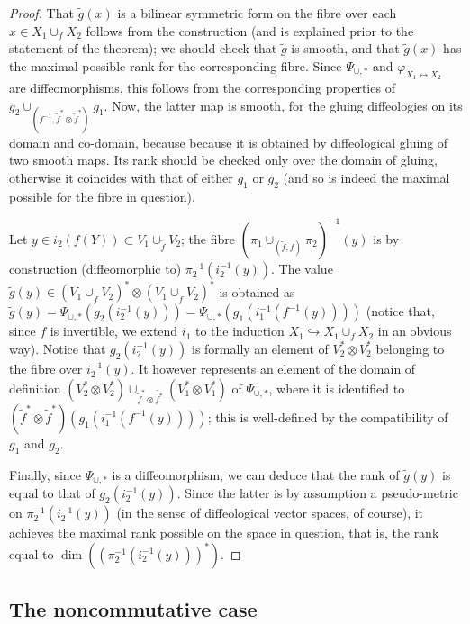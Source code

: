 \documentclass{article}
\begin{document}
\begin{proof}
That $\tilde{g}(x)$ is a bilinear symmetric form on the fibre over each $x\in X_1\cup_f X_2$ follows from the construction (and is explained prior to the statement of the theorem); we should check that 
$\tilde{g}$ is smooth, and that $\tilde{g}(x)$ has the maximal possible rank for the corresponding fibre. Since $\Psi_{\cup,*}$ and $\varphi_{X_1\leftrightarrow X_2}$ are diffeomorphisms, this follows from the 
corresponding properties of $g_2\cup_{(f^{-1},\tilde{f}^*\otimes\tilde{f}^*)}g_1$. Now, the latter map is smooth, for the gluing diffeologies on its domain and co-domain, because because it is obtained by
diffeological gluing of two smooth maps. Its rank should be checked only over the domain of gluing, otherwise it coincides with that of either $g_1$ or $g_2$ (and so is indeed the maximal possible for the
fibre in question).

Let $y\in i_2(f(Y))\subset V_1\cup_{\tilde{f}}V_2$; the fibre $(\pi_1\cup_{(\tilde{f},f)}\pi_2)^{-1}(y)$ is by construction (diffeomorphic to) $\pi_2^{-1}(i_2^{-1}(y))$. The value
$\tilde{g}(y)\in(V_1\cup_{\tilde{f}}V_2)^*\otimes(V_1\cup_{\tilde{f}}V_2)^*$ is obtained as $\tilde{g}(y)=\Psi_{\cup,*}(g_2(i_2^{-1}(y)))=\Psi_{\cup,*}(g_1(i_1^{-1}(f^{-1}(y))))$ (notice that, since $f$ is invertible, 
we extend $i_1$ to the induction $X_1\hookrightarrow X_1\cup_f X_2$ in an obvious way). Notice that $g_2(i_2^{-1}(y))$ is formally an element of $V_2^*\otimes V_2^*$ belonging to the fibre over 
$i_2^{-1}(y)$. It however represents an element of the domain of definition $(V_2^*\otimes V_2^*)\cup_{\tilde{f}^*\otimes\tilde{f^*}}(V_1^*\otimes V_1^*)$ of $\Psi_{\cup,*}$, where it is identified to
$(\tilde{f}^*\otimes\tilde{f}^*)(g_1(i_1^{-1}(f^{-1}(y))))$; this is well-defined by the compatibility of $g_1$ and $g_2$.

Finally, since $\Psi_{\cup,*}$ is a diffeomorphism, we can deduce that the rank of $\tilde{g}(y)$ is equal to that of $g_2(i_2^{-1}(y))$. Since the latter is by assumption a pseudo-metric on 
$\pi_2^{-1}(i_2^{-1}(y))$ (in the sense of diffeological vector spaces, of course), it achieves the maximal rank possible on the space in question, that is, the rank equal to $\dim((\pi_2^{-1}(i_2^{-1}(y)))^*)$.
\end{proof}


\subsection{The noncommutative case}
\end{document}
